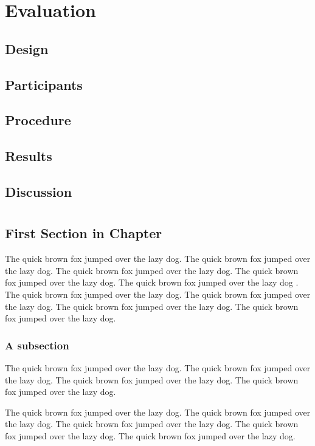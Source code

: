 \documentclass{l4proj}
\begin{document}
\chapter{Evaluation}
\section{Design}
\section{Participants}
\section{Procedure}
\section{Results}
\section{Discussion}

\chapter{}




\section{First Section in Chapter}
The quick brown fox jumped over the lazy dog.
The quick brown fox jumped over the lazy dog.
The quick brown fox jumped over the lazy dog.
The quick brown fox jumped over the lazy dog.
The quick brown fox jumped over the lazy dog \cite{DIMACS}.
The quick brown fox jumped over the lazy dog.
The quick brown fox jumped over the lazy dog.
The quick brown fox jumped over the lazy dog.
The quick brown fox jumped over the lazy dog.

\subsection{A subsection}
The quick brown fox jumped over the lazy dog.
The quick brown fox jumped over the lazy dog.
The quick brown fox jumped over the lazy dog.
The quick brown fox jumped over the lazy dog.

The quick brown fox jumped over the lazy dog.
The quick brown fox jumped over the lazy dog.
The quick brown fox jumped over the lazy dog.
The quick brown fox \cite{fahle} jumped over the lazy dog.
The quick brown fox jumped over the lazy dog.
\end{document}
